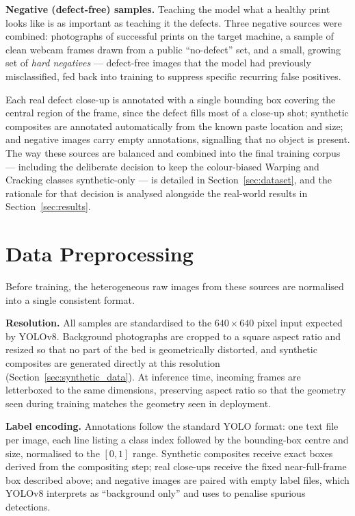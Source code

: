 \documentclass[english, Lau, oneside]{sapthesis}
\begin{document}
\textbf{Negative (defect-free) samples.} Teaching the model what a healthy print looks like is as important as teaching it the defects. Three negative sources were combined: photographs of successful prints on the target machine, a sample of clean webcam frames drawn from a public ``no-defect'' set, and a small, growing set of \textit{hard negatives} --- defect-free images that the model had previously misclassified, fed back into training to suppress specific recurring false positives.

Each real defect close-up is annotated with a single bounding box covering the central region of the frame, since the defect fills most of a close-up shot; synthetic composites are annotated automatically from the known paste location and size; and negative images carry empty annotations, signalling that no object is present. The way these sources are balanced and combined into the final training corpus --- including the deliberate decision to keep the colour-biased Warping and Cracking classes synthetic-only --- is detailed in Section~\ref{sec:dataset}, and the rationale for that decision is analysed alongside the real-world results in Section~\ref{sec:results}.

\section{Data Preprocessing}
Before training, the heterogeneous raw images from these sources are normalised into a single consistent format.

\textbf{Resolution.} All samples are standardised to the $640 \times 640$ pixel input expected by YOLOv8. Background photographs are cropped to a square aspect ratio and resized so that no part of the bed is geometrically distorted, and synthetic composites are generated directly at this resolution (Section~\ref{sec:synthetic_data}). At inference time, incoming frames are letterboxed to the same dimensions, preserving aspect ratio so that the geometry seen during training matches the geometry seen in deployment.

\textbf{Label encoding.} Annotations follow the standard YOLO format: one text file per image, each line listing a class index followed by the bounding-box centre and size, normalised to the $[0,1]$ range. Synthetic composites receive exact boxes derived from the compositing step; real close-ups receive the fixed near-full-frame box described above; and negative images are paired with empty label files, which YOLOv8 interprets as ``background only'' and uses to penalise spurious detections.
\end{document}
